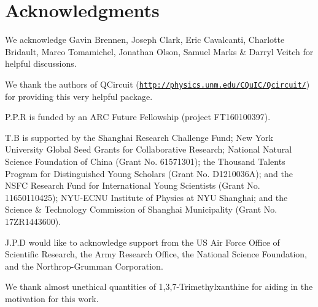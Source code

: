 %
%

\section*{Acknowledgments}

We acknowledge Gavin Brennen, Joseph Clark, Eric Cavalcanti, Charlotte Bridault, Marco Tomamichel, Jonathan Olson, Samuel Marks \& Darryl Veitch for helpful discussions.

We thank the authors of QCircuit (\texttt{\href{http://physics.unm.edu/CQuIC/Qcircuit/}{http://physics.unm.edu/CQuIC/Qcircuit/}}) for providing this very helpful package.

 P.P.R is funded by an ARC Future Fellowship (project FT160100397).
 
 T.B is supported by the Shanghai Research Challenge Fund; New York University Global Seed Grants for Collaborative Research; National Natural Science Foundation of China (Grant No. 61571301); the Thousand Talents Program for Distinguished Young Scholars (Grant No. D1210036A); and the NSFC Research Fund for International Young Scientists (Grant No. 11650110425); NYU-ECNU Institute of Physics at NYU Shanghai; and the Science \& Technology Commission of Shanghai Municipality (Grant No. 17ZR1443600).
 
 J.P.D would like to acknowledge support from the US Air Force Office of Scientific Research, the Army Research Office, the National Science Foundation, and the Northrop-Grumman Corporation.

We thank almost unethical quantities of 1,3,7-Trimethylxanthine for aiding in the motivation for this work.